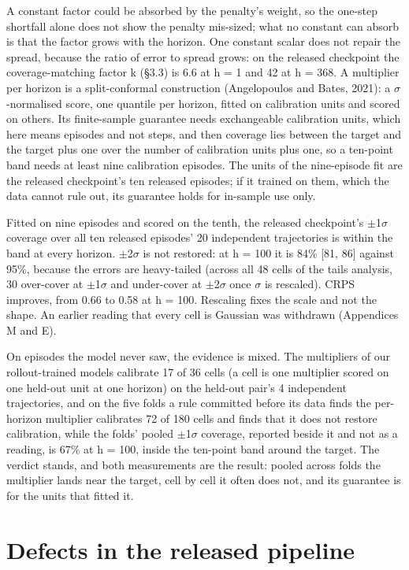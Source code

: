 \documentclass[10pt]{article}
\begin{document}
A constant factor could be absorbed by the penalty's weight, so the one-step shortfall alone does not show the penalty mis-sized; what no constant can absorb is that the factor grows with the horizon. One constant scalar does not repair the spread, because the ratio of error to spread grows: on the released checkpoint the coverage-matching factor k (\S{}3.3) is 6.6 at h = 1 and 42 at h = 368. A multiplier per horizon is a split-conformal construction (Angelopoulos and Bates, 2021): a $\sigma$-normalised score, one quantile per horizon, fitted on calibration units and scored on others. Its finite-sample guarantee needs exchangeable calibration units, which here means episodes and not steps, and then coverage lies between the target and the target plus one over the number of calibration units plus one, so a ten-point band needs at least nine calibration episodes. The units of the nine-episode fit are the released checkpoint's ten released episodes; if it trained on them, which the data cannot rule out, its guarantee holds for in-sample use only.

Fitted on nine episodes and scored on the tenth, the released checkpoint's $\pm$1$\sigma$ coverage over all ten released episodes' 20 independent trajectories is within the band at every horizon. $\pm$2$\sigma$ is not restored: at h = 100 it is 84\% [81, 86] against 95\%, because the errors are heavy-tailed (across all 48 cells of the tails analysis, 30 over-cover at $\pm$1$\sigma$ and under-cover at $\pm$2$\sigma$ once $\sigma$ is rescaled). CRPS improves, from 0.66 to 0.58 at h = 100. Rescaling fixes the scale and not the shape. An earlier reading that every cell is Gaussian was withdrawn (Appendices M and E).

On episodes the model never saw, the evidence is mixed. The multipliers of our rollout-trained models calibrate 17 of 36 cells (a cell is one multiplier scored on one held-out unit at one horizon) on the held-out pair's 4 independent trajectories, and on the five folds a rule committed before its data finds the per-horizon multiplier calibrates 72 of 180 cells and finds that it does not restore calibration, while the folds' pooled $\pm$1$\sigma$ coverage, reported beside it and not as a reading, is 67\% at h = 100, inside the ten-point band around the target. The verdict stands, and both measurements are the result: pooled across folds the multiplier lands near the target, cell by cell it often does not, and its guarantee is for the units that fitted it.


\section{Defects in the released pipeline}
\end{document}
